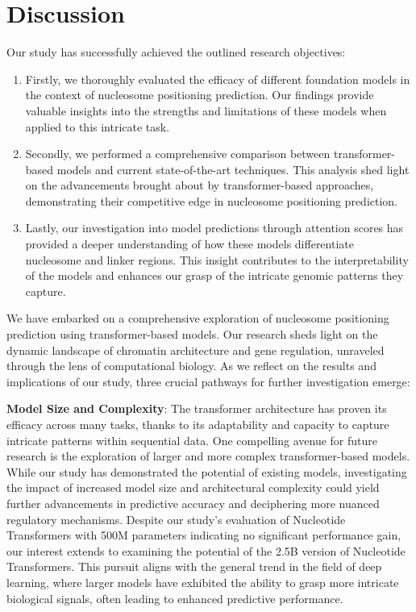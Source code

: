 \documentclass[a4paper,fleqn]{cas-dc}
\begin{document}
\section{Discussion}
Our study has successfully achieved the outlined research objectives:
\begin{enumerate}
    \item Firstly, we thoroughly evaluated the efficacy of different foundation models in the context of nucleosome positioning prediction. Our findings provide valuable insights into the strengths and limitations of these models when applied to this intricate task.
    \item Secondly, we performed a comprehensive comparison between transformer-based models and current state-of-the-art techniques. This analysis shed light on the advancements brought about by transformer-based approaches, demonstrating their competitive edge in nucleosome positioning prediction.
    \item Lastly, our investigation into model predictions through attention scores has provided a deeper understanding of how these models differentiate nucleosome and linker regions. This insight contributes to the interpretability of the models and enhances our grasp of the intricate genomic patterns they capture.
\end{enumerate}


We have embarked on a comprehensive exploration of nucleosome positioning prediction using transformer-based models. Our research sheds light on the dynamic landscape of chromatin architecture and gene regulation, unraveled through the lens of computational biology. As we reflect on the results and implications of our study, three crucial pathways for further investigation emerge:

\textbf{Model Size and Complexity}: The transformer architecture has proven its efficacy across many tasks, thanks to its adaptability and capacity to capture intricate patterns within sequential data. One compelling avenue for future research is the exploration of larger and more complex transformer-based models. While our study has demonstrated the potential of existing models, investigating the impact of increased model size and architectural complexity could yield further advancements in predictive accuracy and deciphering more nuanced regulatory mechanisms. Despite our study's evaluation of Nucleotide Transformers with 500M parameters indicating no significant performance gain, our interest extends to examining the potential of the 2.5B version of Nucleotide Transformers. This pursuit aligns with the general trend in the field of deep learning, where larger models have exhibited the ability to grasp more intricate biological signals, often leading to enhanced predictive performance.
\end{document}
